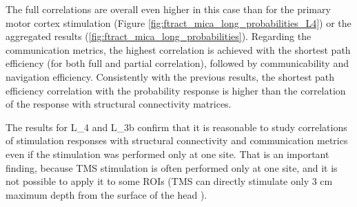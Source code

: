The full correlations are overall even higher in this case than for the primary motor cortex stimulation (Figure \ref{fig:ftract_mica_long_probabilities_L4}) or the aggregated results (\ref{fig:ftract_mica_long_probabilities}). Regarding the communication metrics, the highest correlation is achieved with the shortest path efficiency (for both full and partial correlation), followed by communicability and navigation efficiency. Consistently with the previous results, the shortest path efficiency correlation with the probability response is higher than the correlation of the response with structural connectivity matrices.

The results for L\_4 and L\_3b confirm that it is reasonable to study correlations of stimulation responses with structural connectivity and communication metrics even if the stimulation was performed only at one site. That is an important finding, because TMS stimulation is often performed only at one site, and it is not possible to apply it to some ROIs (TMS can directly stimulate only 3 cm maximum depth from the surface of the head \cite{luber_using_2022}).